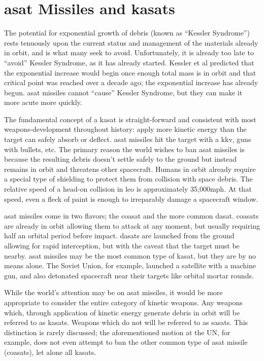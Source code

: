\section*{\ac{asat} Missiles and \acfp{kasat}}

The potential for exponential growth of debris (known as ``Kessler
Syndrome'') rests tenuously upon the current status and management of
the materials already in orbit, and is what many seek to avoid.
Unfortunately, it is already too late to ``avoid'' Kessler Syndrome,
as it has already started.  Kessler et al predicted that the
exponential increase would begin once enough total mass is in orbit
and that critical point was reached over a decade ago; the exponential
increase has already begun.  \ac{asat} missiles cannot ``cause''
Kessler Syndrome, but they can make it more acute more quickly.

The fundamental concept of a \ac{kasat} is straight-forward and
consistent with most weapons-development throughout history: apply
more kinetic energy than the target can safely absorb or deflect.
\ac{asat} missiles hit the target with a \ac{kkv}, guns with bullets,
etc.  The primary reason the world wishes to ban \ac{asat} missiles is
because the resulting debris doesn't settle safely to the ground but
instead remains in orbit and threatens other spacecraft.  Humans in
orbit already require a special type of shielding to protect them from
collision with space debris.  The relative speed of a head-on
collision in \ac{leo} is approximately 35,000mph.  At that speed, even
a fleck of paint is enough to irreparably damage a spacecraft window.

\ac{asat} missiles come in two flavors; the \acf{coasat} and the more
common \acf{dasat}.  \acp{coasat} are already in orbit allowing them
to attack at any moment, but usually requiring half an orbital period
before impact.  \acp{dasat} are launched from the ground allowing for
rapid interception, but with the caveat that the target must be
nearby.  \ac{asat} missiles may be the most common type of \ac{kasat},
but they are by no means alone.  The Soviet Union, for example,
launched a satellite with a machine gun, and also detonated spacecraft
near their targets like orbital mortar rounds.

While the world's attention may be on \ac{asat} missiles, it would be
more appropriate to consider the entire category of kinetic weapons.
Any weapons which, through application of kinetic energy generate
debris in orbit will be referred to as \acp{kasat}.  Weapons which do
not will be referred to as \acp{sasat}.  This distinction is rarely
discussed; the aforementioned motion at the UN, for example, does not
even attempt to ban the other common type of \ac{asat} missile
(\acp{coasat}), let alone all \acp{kasat}.

